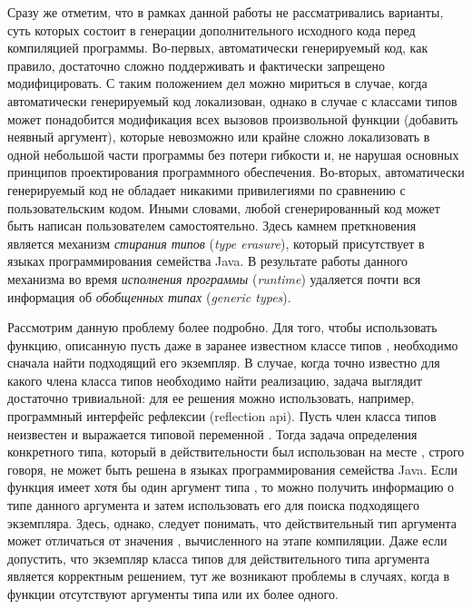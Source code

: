 Сразу же отметим, что в рамках данной работы не рассматривались варианты, суть которых состоит в генерации дополнительного исходного кода перед компиляцией программы. Во-первых, автоматически генерируемый код, как правило, достаточно сложно поддерживать и фактически запрещено модифицировать. С таким положением дел можно мириться в случае, когда автоматически генерируемый код локализован, однако в случае с классами типов может понадобится модификация всех вызовов произвольной функции (добавить неявный аргумент), которые невозможно или крайне сложно локализовать в одной небольшой части программы без потери гибкости и, не нарушая основных принципов проектирования программного обеспечения. Во-вторых, автоматически генерируемый код не обладает никакими привилегиями по сравнению с пользовательским кодом. Иными словами, любой сгенерированный код может быть написан пользователем самостоятельно. Здесь камнем преткновения является механизм \emph{стирания типов} (\emph{type erasure}), который присутствует в языках программирования семейства Java. В результате работы данного механизма во время \emph{исполнения программы} (\emph{runtime}) удаляется почти вся информация об \emph{обобщенных типах} (\emph{generic types}). 

Рассмотрим данную проблему более подробно. Для того, чтобы использовать функцию, описанную пусть даже в заранее известном классе типов , необходимо сначала найти подходящий его экземпляр. В случае, когда точно известно для какого члена класса типов  необходимо найти реализацию, задача выглядит достаточно тривиальной: для ее решения можно использовать, например, программный интерфейс рефлексии (reflection api). Пусть член класса типов неизвестен и выражается типовой переменной . Тогда задача определения конкретного типа, который в действительности был использован на месте , строго говоря, не может быть решена в языках программирования семейства Java. Если функция имеет хотя бы один аргумент типа , то можно получить информацию о типе данного аргумента и затем использовать его для поиска подходящего экземпляра. Здесь, однако, следует понимать, что действительный тип аргумента может отличаться от значения , вычисленного на этапе компиляции. Даже если допустить, что экземпляр класса типов для действительного типа аргумента является корректным решением, тут же возникают проблемы в случаях, когда в функции отсутствуют аргументы типа  или их более одного. %

